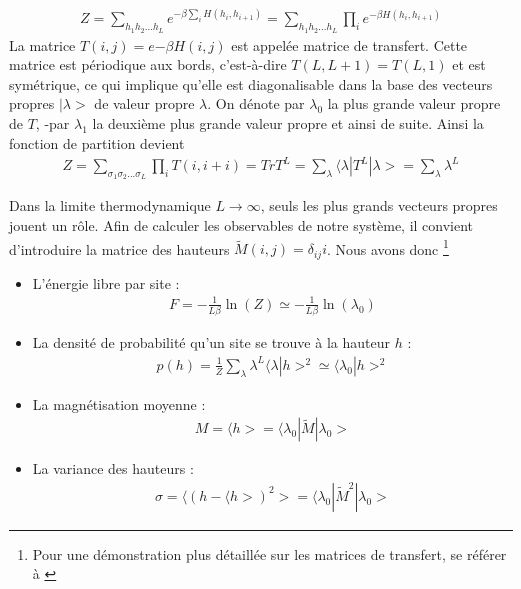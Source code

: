 \begin{align*}
 Z = \sum_{h_1 h_2 ... h_L} e^{- \beta \sum_{i} H(h_i,h_{i+1})}  
   = \sum_{h_1 h_2 ... h_L} \prod_{i} e^{-\beta H(h_i,h_{i+1})} 
\end{align*}
La matrice $T(i,j) = e{-\beta H(i,j)}$ est appelée matrice de transfert. Cette matrice est périodique aux bords, c'est-à-dire $T(L,L+1) = T(L,1)$ et est symétrique, ce qui implique qu'elle est diagonalisable dans la base des vecteurs propres $|\lambda >$ de valeur propre $\lambda$. On dénote par $\lambda_0$ la plus grande valeur propre de $T$, -par $\lambda_1$ la deuxième plus grande valeur propre et ainsi de suite.
Ainsi la fonction de partition devient\cite{}
\begin{align}
  Z = \sum_{\sigma_1 \sigma_2 ... \sigma_{L}} \prod_{i} T(i,i+i) = Tr T^L  = \sum_\lambda \langle\lambda | T^L | \lambda> = \sum_\lambda \lambda^L
\end{align}

Dans la limite thermodynamique $L \to \infty$, seuls les plus grands vecteurs propres jouent un rôle. Afin de calculer les observables de notre système, il convient d'introduire la matrice des hauteurs $\tilde{M}(i,j) = \delta_{ij} i$. Nous avons donc \footnote{Pour une démonstration plus détaillée sur les matrices de transfert, se référer à \cite{matrice_transfert}}
\begin{itemize}
	\item L'énergie libre par site :  
	\begin{align}
		F =  - \frac{1}{L \beta} \ln(Z) \simeq - \frac{1}{L \beta } \ln( \lambda_0)
	\end{align}
	\item La densité de probabilité qu'un site se trouve à la hauteur $h$ : 
	\begin{align}
		p(h) = \frac{1}{Z} \sum_\lambda \lambda^L \langle\lambda | h >^2 \simeq \langle \lambda_0 | h >^2
	\end{align}
	\item La magnétisation moyenne :
	\begin{align}
		M = \langle h > = \langle \lambda_0 | \tilde{M} | \lambda_0 > 
	\end{align}
	\item La variance des hauteurs :
	\begin{align}
		\sigma = \langle (h - \langle h >)^2 > =  \langle \lambda_0 | \tilde{M}^2 | \lambda_0 >
	\end{align}
\end{itemize}


